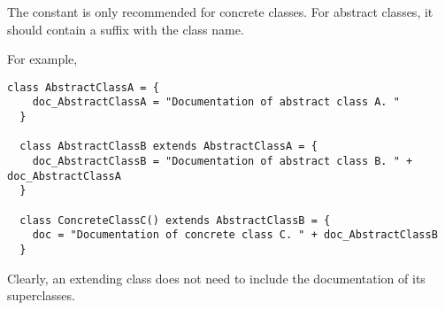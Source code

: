 The  constant is only recommended for concrete classes.
For abstract classes, it should contain a suffix with the class name.

For example,
\begin{lstlisting}[label={lst:exampleAbstractAndConcreteClassesWithComment}]
  class AbstractClassA = {
    doc_AbstractClassA = "Documentation of abstract class A. "
  }

  class AbstractClassB extends AbstractClassA = {
    doc_AbstractClassB = "Documentation of abstract class B. " + doc_AbstractClassA
  }

  class ConcreteClassC() extends AbstractClassB = {
    doc = "Documentation of concrete class C. " + doc_AbstractClassB
  }
\end{lstlisting}

Clearly, an extending class does not need to include the documentation of its superclasses.

